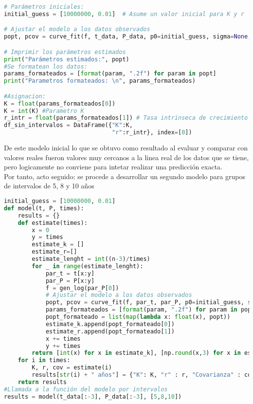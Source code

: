 \documentclass[a4paper,10pt,twocolumn]{article}
\begin{document}
\begin{lstlisting}[language=Python, caption=Estimación de parámetros]
# Parámetros iniciales:
initial_guess = [10000000, 0.01]  # Asume un valor inicial para K y r

# Ajustar el modelo a los datos observados
popt, pcov = curve_fit(f, t_data, P_data, p0=initial_guess, sigma=None, absolute_sigma=False)

# Imprimir los parámetros estimados
print("Parámetros estimados:", popt)
#Se formatean los datos:
params_formateados = [format(param, ".2f") for param in popt]
print("Parametros formateados: \n", params_formateados)

#Asignacion:
K = float(params_formateados[0])
K = int(K) #Parametro K
r_intr = float(params_formateados[1]) # Tasa intrinseca de crecimiento r
df_sin_intervalos = DataFrame({"K":K, 
                               "r":r_intr}, index=[0])
\end{lstlisting}
De este modelo inicial lo que se obtuvo como resultado al evaluar y comparar con valores reales fueron valores muy cercanos a la linea real de los datos que se tiene, pero logicamente no conviene para intetar realizar una predicción exacta.\\
Por tanto, acto seguido: se procede a desarrollar un segundo modelo para grupos de intervalos de 5, 8 y 10 años

\begin{lstlisting}[language=Python, caption=Estimación de parámetros]
initial_guess = [10000000, 0.01]
def model(t, P, times):
    results = {}
    def estimate(times):
        x = 0
        y = times
        estimate_k = []
        estimate_r=[]
        estimate_lenght = int((n-3)/times)
        for _ in range(estimate_lenght):
            par_t = t[x:y]
            par_P = P[x:y]
            f = gen_log(par_P[0]) 
            # Ajustar el modelo a los datos observados
            popt, pcov = curve_fit(f, par_t, par_P, p0=initial_guess, sigma=None, absolute_sigma=False)
            params_formateados = [format(param, ".2f") for param in popt]
            popt_formateado = list(map(lambda x: float(x), popt))
            estimate_k.append(popt_formateado[0])
            estimate_r.append(popt_formateado[1])
            x += times
            y += times
        return [int(x) for x in estimate_k], [np.round(x,3) for x in estimate_r], pcov
    for i in times:
        K, r, cov = estimate(i)
        results[str(i) + " años"] = {"K": K, "r" : r, "Covarianza" : cov}
    return results
#Llamada a la función del modelo por intervalos
results = model(t_data[:-3], P_data[:-3], [5,8,10])
\end{lstlisting}
\end{document}
